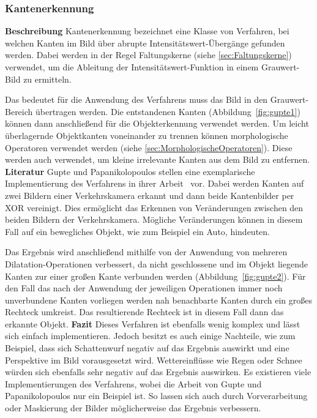\subsubsection{Kantenerkennung}
\textbf{Beschreibung}\newline
Kantenerkennung bezeichnet eine Klasse von Verfahren, bei welchen Kanten im Bild über abrupte Intensitätswert-Übergänge gefunden werden. 
Dabei werden in der Regel Faltungskerne (siehe \ref{sec:Faltungskerne}) verwendet, um die Ableitung der Intensitätswert-Funktion in einem Grauwert-Bild zu ermitteln.

Das bedeutet für die Anwendung des Verfahrens muss das Bild in den Grauwert-Bereich übertragen werden.
Die entstandenen Kanten (Abbildung~\ref{fig:gupte1}) können dann anschließend für die Objekterkennung verwendet werden. 
Um leicht überlagernde Objektkanten voneinander zu trennen können morphologische Operatoren verwendet werden (siehe \ref{sec:MorphologischeOperatoren}).
Diese werden auch verwendet, um kleine irrelevante Kanten aus dem Bild zu entfernen.
\newline\newline
\textbf{Literatur}\newline
Gupte und Papanikolopoulos stellen eine exemplarische Implementierung  des Verfahrens in ihrer Arbeit~\cite{gupte2000algorithms} vor. 
Dabei werden Kanten auf zwei Bildern einer Verkehrskamera erkannt und dann beide Kantenbilder per XOR vereinigt. 
Dies ermöglicht das Erkennen von Veränderungen zwischen den beiden Bildern der Verkehrskamera.
Mögliche Veränderungen können in diesem Fall auf ein bewegliches Objekt, wie zum Beispiel ein Auto, hindeuten.

Das Ergebnis wird anschließend mithilfe von der Anwendung von mehreren Dilatation-Operationen verbessert, da nicht geschlossene und im Objekt liegende Kanten zur einer großen Kante verbunden werden (Abbildung~\ref{fig:gupte2}).
Für den Fall das nach der Anwendung der jeweiligen Operationen immer noch unverbundene Kanten vorliegen werden nah benachbarte Kanten durch ein großes Rechteck umkreist.
Das resultierende Rechteck ist in diesem Fall dann das erkannte Objekt.
\newline\newline
\textbf{Fazit}\newline
Dieses Verfahren ist ebenfalls wenig komplex und lässt sich einfach implementieren. 
Jedoch besitzt es auch einige Nachteile, wie zum Beispiel, dass sich Schattenwurf negativ auf das Ergebnis auswirkt und eine Perspektive im Bild vorausgesetzt wird.
Wettereinflüsse wie Regen oder Schnee würden sich ebenfalls sehr negativ auf das Ergebnis auswirken.
Es existieren viele Implementierungen des Verfahrens, wobei die Arbeit von Gupte und Papanikolopoulos nur ein Beispiel ist.
So lassen sich auch durch Vorverarbeitung oder Maskierung der Bilder möglicherweise das Ergebnis verbessern.

